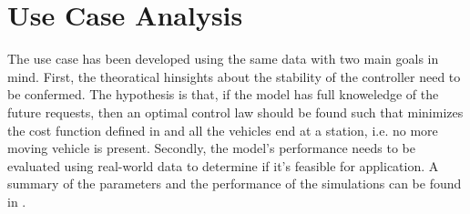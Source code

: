 


\section{Use Case Analysis}\label{sec:use_case_mpc}
The use case has been developed using the same data  with two main goals in mind. First, the theoratical hinsights about the stability of the controller need to be confermed. The hypothesis is that, if the model has full knoweledge of the future requests, then an optimal control law should be found such that minimizes the cost function defined in  and all the vehicles end at a station, i.e. no more moving vehicle is present. Secondly, the model's performance needs to be evaluated using real-world data to determine if it's feasible for application. A summary of the parameters and the performance of the simulations can be found in .  



